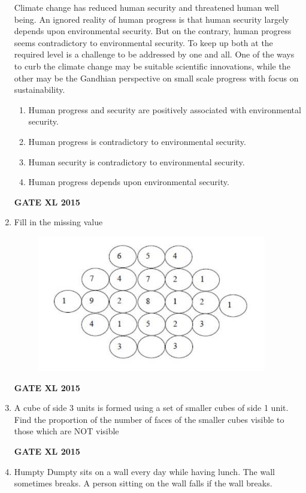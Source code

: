 \documentclass[journal,12pt,onecolumn]{IEEEtran}
\begin{document}
\begin{enumerate}
Climate change has reduced human security and threatened human well being. An ignored reality of human progress is that human security largely depends upon environmental security. But on the contrary, human progress seems contradictory to environmental security. To keep up both at the required level is a challenge to be addressed by one and all. One of the ways to curb the climate change may be suitable scientific innovations, while the other may be the Gandhian perspective on small scale progress with focus on sustainability.
    \begin{enumerate}
            \item Human progress and security are positively associated with environmental security.
            \item Human progress is contradictory to environmental security.
	\item Human security is contradictory to environmental security.  
            \item Human progress depends upon environmental security.
    \end{enumerate}
\hfill{\textbf{GATE XL 2015}}
\item Fill in the missing value
	\begin{figure}[h!]
	\centering
	\includegraphics[width=10cm]{8}
	\caption*{}
	\label{fig:Q8}
	\end{figure}
\hfill{\textbf{GATE XL 2015}}
\item 
A cube of side 3 units is formed using a set of smaller cubes of side 1 unit. Find the proportion of the number of faces of the smaller cubes visible to those which are NOT visible
    \begin{enumerate}
    \end{enumerate}
\hfill{\textbf{GATE XL 2015}}
\item Humpty Dumpty sits on a wall every day while having lunch. The wall sometimes breaks. A person sitting on the wall falls if the wall breaks.


\end{enumerate}
\end{document}
